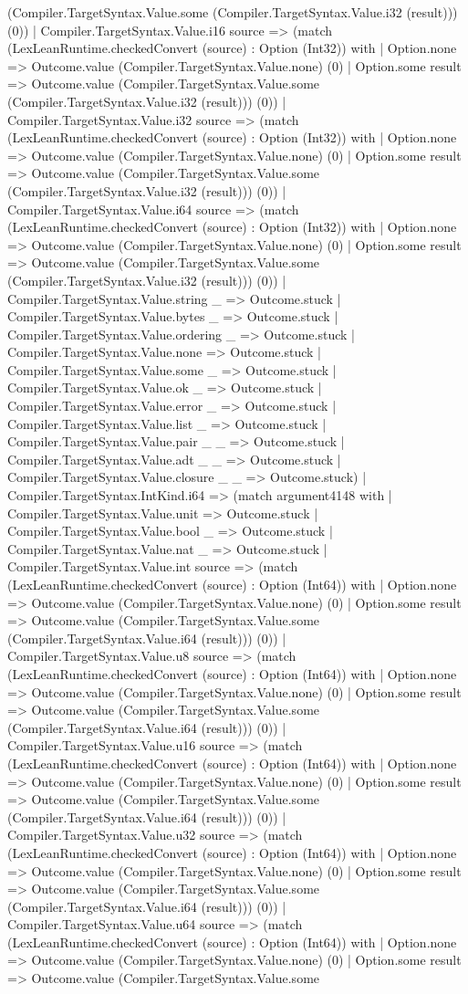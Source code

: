 \documentclass[11pt]{article}
\begin{document}
(Compiler.TargetSyntax.Value.some (Compiler.TargetSyntax.Value.i32 (result))) (0)) | Compiler.TargetSyntax.Value.i16 source => (match (LexLeanRuntime.checkedConvert (source) : Option (Int32)) with | Option.none => Outcome.value (Compiler.TargetSyntax.Value.none) (0) | Option.some result => Outcome.value (Compiler.TargetSyntax.Value.some (Compiler.TargetSyntax.Value.i32 (result))) (0)) | Compiler.TargetSyntax.Value.i32 source => (match (LexLeanRuntime.checkedConvert (source) : Option (Int32)) with | Option.none => Outcome.value (Compiler.TargetSyntax.Value.none) (0) | Option.some result => Outcome.value (Compiler.TargetSyntax.Value.some (Compiler.TargetSyntax.Value.i32 (result))) (0)) | Compiler.TargetSyntax.Value.i64 source => (match (LexLeanRuntime.checkedConvert (source) : Option (Int32)) with | Option.none => Outcome.value (Compiler.TargetSyntax.Value.none) (0) | Option.some result => Outcome.value (Compiler.TargetSyntax.Value.some (Compiler.TargetSyntax.Value.i32 (result))) (0)) | Compiler.TargetSyntax.Value.string \_ => Outcome.stuck | Compiler.TargetSyntax.Value.bytes \_ => Outcome.stuck | Compiler.TargetSyntax.Value.ordering \_ => Outcome.stuck | Compiler.TargetSyntax.Value.none => Outcome.stuck | Compiler.TargetSyntax.Value.some \_ => Outcome.stuck | Compiler.TargetSyntax.Value.ok \_ => Outcome.stuck | Compiler.TargetSyntax.Value.error \_ => Outcome.stuck | Compiler.TargetSyntax.Value.list \_ => Outcome.stuck | Compiler.TargetSyntax.Value.pair \_ \_ => Outcome.stuck | Compiler.TargetSyntax.Value.adt \_ \_ => Outcome.stuck | Compiler.TargetSyntax.Value.closure \_ \_ => Outcome.stuck) | Compiler.TargetSyntax.IntKind.i64 => (match argument4148 with | Compiler.TargetSyntax.Value.unit => Outcome.stuck | Compiler.TargetSyntax.Value.bool \_ => Outcome.stuck | Compiler.TargetSyntax.Value.nat \_ => Outcome.stuck | Compiler.TargetSyntax.Value.int source => (match (LexLeanRuntime.checkedConvert (source) : Option (Int64)) with | Option.none => Outcome.value (Compiler.TargetSyntax.Value.none) (0) | Option.some result => Outcome.value (Compiler.TargetSyntax.Value.some (Compiler.TargetSyntax.Value.i64 (result))) (0)) | Compiler.TargetSyntax.Value.u8 source => (match (LexLeanRuntime.checkedConvert (source) : Option (Int64)) with | Option.none => Outcome.value (Compiler.TargetSyntax.Value.none) (0) | Option.some result => Outcome.value (Compiler.TargetSyntax.Value.some (Compiler.TargetSyntax.Value.i64 (result))) (0)) | Compiler.TargetSyntax.Value.u16 source => (match (LexLeanRuntime.checkedConvert (source) : Option (Int64)) with | Option.none => Outcome.value (Compiler.TargetSyntax.Value.none) (0) | Option.some result => Outcome.value (Compiler.TargetSyntax.Value.some (Compiler.TargetSyntax.Value.i64 (result))) (0)) | Compiler.TargetSyntax.Value.u32 source => (match (LexLeanRuntime.checkedConvert (source) : Option (Int64)) with | Option.none => Outcome.value (Compiler.TargetSyntax.Value.none) (0) | Option.some result => Outcome.value (Compiler.TargetSyntax.Value.some (Compiler.TargetSyntax.Value.i64 (result))) (0)) | Compiler.TargetSyntax.Value.u64 source => (match (LexLeanRuntime.checkedConvert (source) : Option (Int64)) with | Option.none => Outcome.value (Compiler.TargetSyntax.Value.none) (0) | Option.some result => Outcome.value (Compiler.TargetSyntax.Value.some 
\end{document}
